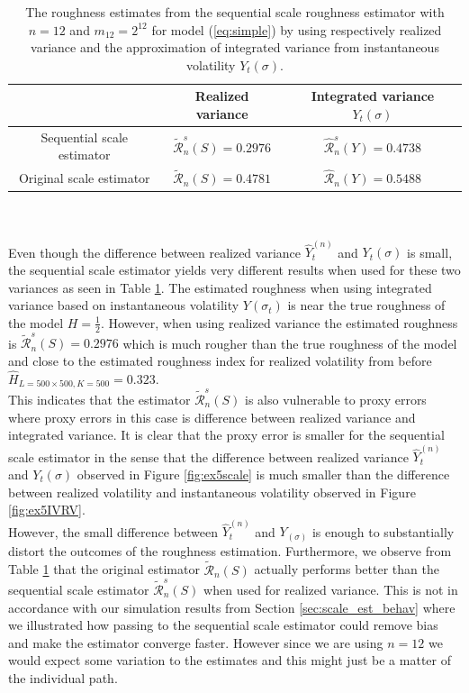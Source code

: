 \documentclass{article}
\begin{document}
\begin{table}[htbp]
    \centering
    \begin{tabular}{ccc}
        \toprule
         & Realized variance & Integrated variance $Y_t(\sigma)$ \\
        \midrule
        Sequential scale estimator & $\widetilde{\mathscr{R}}_n^s (S) = 0.2976 $ & $\widehat{\mathscr{R}}_n^s (Y) = 0.4738$ \\
        Original scale estimator &$\widetilde{\mathscr{R}}_n (S) = 0.4781 $ & $\widehat{\mathscr{R}}_n (Y) = 0.5488$ \\
        \bottomrule
    \end{tabular}
    \caption{The roughness estimates from the sequential scale roughness estimator with $n=12$ and $m_{12}=2^{12}$ for model (\ref{eq:simple}) by using respectively realized variance and the approximation of integrated variance from instantaneous volatility $Y_t(\sigma)$.}
    \label{tab:ex5scaleest}
\end{table}\\\\
Even though the difference between realized variance $\widehat{Y}_t^{(n)}$ and $Y_t(\sigma)$ is small, the sequential scale estimator yields very different results when used for these two variances as seen in Table \ref{tab:ex5scaleest}. The estimated roughness when using integrated variance based on instantaneous volatility $Y(\sigma_t)$ is near the true roughness of the model $H=\frac{1}{2}$. However, when using realized variance the estimated roughness is $\widetilde{\mathscr{R}}_n^s (S)=0.2976$ which is much rougher than the true roughness of the model and close to the estimated roughness index for realized volatility from before $\hat{H}_{L=500\times 500,K = 500} = 0.323$. \\
This indicates that the estimator $\widetilde{\mathscr{R}}_n^s (S)$ is also vulnerable to proxy errors where proxy errors in this case is difference between realized variance and integrated variance. It is clear that the proxy error is smaller for the sequential scale estimator in the sense that the difference between realized variance $\widehat{Y}_t^{(n)}$ and $Y_t(\sigma)$ observed in Figure \ref{fig:ex5scale} is much smaller than the difference between realized volatility and instantaneous volatility observed in Figure \ref{fig:ex5IVRV}. \\
However, the small difference between $\widehat{Y}_t^{(n)}$ and $Y_(\sigma)$ is enough to substantially distort the outcomes of the roughness estimation. Furthermore, we observe from Table \ref{tab:ex5scaleest} that the original estimator $\widetilde{\mathscr{R}}_n(S)$ actually performs better than the sequential scale estimator $\widetilde{\mathscr{R}}_n^s(S)$ when used for realized variance. This is not in accordance with our simulation results from Section \ref{sec:scale_est_behav} where we illustrated how passing to the sequential scale estimator could remove bias and make the estimator converge faster. However since we are using $n=12$ we would expect some variation to the estimates and this might just be a matter of the individual path.\\\\
\end{document}

